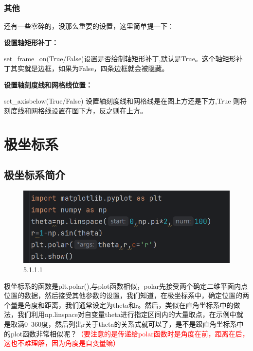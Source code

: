 \documentclass[12pt]{article}
\begin{document}
\subsubsection{其他}
还有一些零碎的，没那么重要的设置，这里简单提一下：

\noindent \textbf{\large 设置轴矩形补丁：}

set\_frame\_on(True/False)设置是否绘制轴矩形补丁,默认是True。这个轴矩形补丁其实就是边框，如果为False，四条边框就会被隐藏。

\noindent \textbf{\large 设置轴刻度线和网格线位置：}

set\_axisbelow(True/False) 设置轴刻度线和网格线是在图上方还是下方,True 则将刻度线和网格线设置在图下方，反之则在上方。
\newpage
\section{极坐标系}
\subsection{极坐标系简介}
\begin{figure}[H]
    \centering
    \includegraphics[width=0.75\linewidth]{极坐标 program1.png}
    \caption{5.1.1.1}
    \label{fig:enter-label}
\end{figure}
极坐标系的函数是plt.polar(),与plot函数相似，polar先接受两个确定二维平面内点位置的数据，然后接受其他参数的设置，我们知道，在极坐标系中，确定位置的两个量是角度和距离，我们通常设定为theta和r。然后，类似在直角坐标系中的做法，我们利用np.linspace对自变量theta进行指定区间内的大量取点，在示例中就是取满0~360度，然后列出r关于theta的关系式就可以了，是不是跟直角坐标系中的plot函数非常相似呢？\textcolor{red}{（要注意的是传递给polar函数时是角度在前，距离在后，这也不难理解，因为角度是自变量嘛）}
\end{document}
